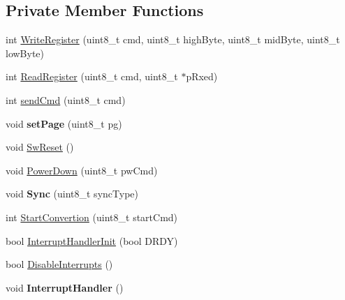 \subsection*{Private Member Functions}
\begin{DoxyCompactItemize}
\item 
int \hyperlink{classcs5463spi_ac5ceba73424261fdf42f68448535ec75}{Write\-Register} (uint8\-\_\-t cmd, uint8\-\_\-t high\-Byte, uint8\-\_\-t mid\-Byte, uint8\-\_\-t low\-Byte)
\item 
int \hyperlink{classcs5463spi_a45c08ae60291209a0878b859872a9fbe}{Read\-Register} (uint8\-\_\-t cmd, uint8\-\_\-t $\ast$p\-Rxed)
\item 
int \hyperlink{classcs5463spi_a4eef4adeb61cdf3d818e410d4d5e37aa}{send\-Cmd} (uint8\-\_\-t cmd)
\item 
\hypertarget{classcs5463spi_a9e5ec18debabcf9ef375224cf08cecb0}{void {\bfseries set\-Page} (uint8\-\_\-t pg)}\label{classcs5463spi_a9e5ec18debabcf9ef375224cf08cecb0}

\item 
void \hyperlink{classcs5463spi_aafda987549f89a9917cec36f74e17874}{Sw\-Reset} ()
\item 
void \hyperlink{classcs5463spi_af398289d5aa2398af031696f58fbf2e5}{Power\-Down} (uint8\-\_\-t pw\-Cmd)
\item 
\hypertarget{classcs5463spi_a98b2af7f4a7ffe2e8281557a7ec91394}{void {\bfseries Sync} (uint8\-\_\-t sync\-Type)}\label{classcs5463spi_a98b2af7f4a7ffe2e8281557a7ec91394}

\item 
int \hyperlink{classcs5463spi_ab4061eb580d7951c6a0a1f57cef02359}{Start\-Convertion} (uint8\-\_\-t start\-Cmd)
\item 
bool \hyperlink{classcs5463spi_ad121321a0ce78ea58e1425f157b96074}{Interrupt\-Handler\-Init} (bool D\-R\-D\-Y)
\item 
bool \hyperlink{classcs5463spi_abffdb96164657da7d6c8f125c3b776ec}{Disable\-Interrupts} ()
\item 
\hypertarget{classcs5463spi_a61d65a32ed681d1bec2ab60a723502e9}{void {\bfseries Interrupt\-Handler} ()}\label{classcs5463spi_a61d65a32ed681d1bec2ab60a723502e9}


\end{DoxyCompactItemize}
